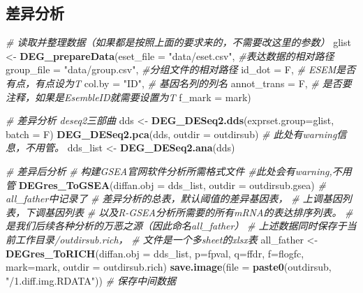 \documentclass[
]{book}
\newenvironment{Shaded}{\begin{snugshade}}{\end{snugshade}}
\newcommand{\AttributeTok}[1]{\textcolor[rgb]{0.13,0.29,0.53}{#1}}
\newcommand{\CommentTok}[1]{\textcolor[rgb]{0.56,0.35,0.01}{\textit{#1}}}
\newcommand{\FunctionTok}[1]{\textcolor[rgb]{0.13,0.29,0.53}{\textbf{#1}}}
\newcommand{\NormalTok}[1]{#1}
\newcommand{\OtherTok}[1]{\textcolor[rgb]{0.56,0.35,0.01}{#1}}
\newcommand{\StringTok}[1]{\textcolor[rgb]{0.31,0.60,0.02}{#1}}
\begin{document}
\subsection{差异分析}\label{ux5deeux5f02ux5206ux6790}

\begin{Shaded}
\begin{Highlighting}[]
\CommentTok{\# 读取并整理数据（如果都是按照上面的要求来的，不需要改这里的参数）}
\NormalTok{glist }\OtherTok{\textless{}{-}} \FunctionTok{DEG\_prepareData}\NormalTok{(}\AttributeTok{eset\_file =} \StringTok{"data/eset.csv"}\NormalTok{, }\CommentTok{\#表达数据的相对路径}
                         \AttributeTok{group\_file =} \StringTok{"data/group.csv"}\NormalTok{, }\CommentTok{\#分组文件的相对路径}
                         \AttributeTok{id\_dot =}\NormalTok{ F,  }\CommentTok{\# ESEM是否有点，有点设为T}
                         \AttributeTok{col.by =} \StringTok{"ID"}\NormalTok{,  }\CommentTok{\# 基因名列的列名}
                         \AttributeTok{annot\_trans =}\NormalTok{ F, }\CommentTok{\# 是否要注释，如果是EsembleID就需要设置为T}
                         \AttributeTok{f\_mark =}\NormalTok{ mark)}

\CommentTok{\# 差异分析 deseq2三部曲}
\NormalTok{dds }\OtherTok{\textless{}{-}} \FunctionTok{DEG\_DESeq2.dds}\NormalTok{(}\AttributeTok{exprset.group=}\NormalTok{glist, }\AttributeTok{batch =}\NormalTok{ F)}
\FunctionTok{DEG\_DESeq2.pca}\NormalTok{(dds, }\AttributeTok{outdir =}\NormalTok{ outdirsub) }\CommentTok{\# 此处有warning信息，不用管。}
\NormalTok{dds\_list }\OtherTok{\textless{}{-}} \FunctionTok{DEG\_DESeq2.ana}\NormalTok{(dds)}

\CommentTok{\# 差异后分析}
\CommentTok{\# 构建GSEA官网软件分析所需格式文件 \#此处会有warning,不用管}
\FunctionTok{DEGres\_ToGSEA}\NormalTok{(}\AttributeTok{diffan.obj =}\NormalTok{ dds\_list, }\AttributeTok{outdir =}\NormalTok{ outdirsub.gsea) }
\CommentTok{\# all\_father中记录了}
\CommentTok{\#             差异分析的总表，默认阈值的差异基因表，}
\CommentTok{\#             上调基因列表，下调基因列表}
\CommentTok{\#             以及R{-}GSEA分析所需要的所有mRNA的表达排序列表。}
\CommentTok{\#  是我们后续各种分析的万恶之源（因此命名all\_father）}
\CommentTok{\#  上述数据同时保存于当前工作目录/outdirsub.rich，}
\CommentTok{\#  文件是一个多sheet的xlsx表}
\NormalTok{all\_father }\OtherTok{\textless{}{-}} \FunctionTok{DEGres\_ToRICH}\NormalTok{(}\AttributeTok{diffan.obj =}\NormalTok{ dds\_list, }\AttributeTok{p=}\NormalTok{fpval, }\AttributeTok{q=}\NormalTok{ffdr, }
                            \AttributeTok{f=}\NormalTok{flogfc, }\AttributeTok{mark=}\NormalTok{mark, }\AttributeTok{outdir =}\NormalTok{ outdirsub.rich)}
\FunctionTok{save.image}\NormalTok{(}\AttributeTok{file =} \FunctionTok{paste0}\NormalTok{(outdirsub, }\StringTok{"/1.diff.img.RDATA"}\NormalTok{)) }\CommentTok{\# 保存中间数据}
\end{Highlighting}
\end{Shaded}
\end{document}
